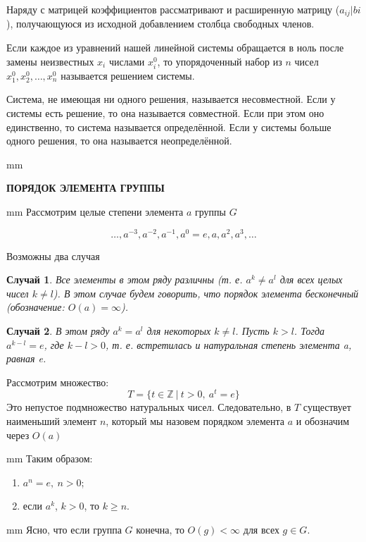 \documentclass[12pt,english,russian]{article}
\newtheorem{sluch}{Случай}
\begin{document}
	Наряду с матрицей коэффициентов рассматривают и
	расширенную матрицу
	($a_{ij}|bi$), получающуюся из исходной добавлением столбца свободных членов.

	Если каждое из уравнений нашей линейной системы обращается в ноль после замены неизвестных 
	$x_i$ числами
	$x_i^0$, то упорядоченный набор из $n$ чисел
	$x_1^0, x_2^0, \dots , x_n^0$ называется решением
	системы. 

	Система, не имеющая ни одного решения, называется
	несовместной. Если у системы есть решение, то она называется
	совместной. Если при этом оно единственно, то система называется
	определённой. Если у системы больше одного решения, то она называется
	неопределённой.
	
	 mm
	\begin{center}
		{\large {\bf ПОРЯДОК ЭЛЕМЕНТА ГРУППЫ}}
	\end{center}
	
	 mm
	Рассмотрим целые степени элемента $a$ группы $G$
	
	$$\dots ,a^{-3},a^{-2},a^{-1},a^0 = e,a,a^2,a^3,\dots$$
	
	Возможны два случая
	\begin{sluch}
		Все элементы в этом ряду различны (т. е. $a^k \ne a^l$ для 
		всех целых чисел $k\ne l$). В этом случае будем говорить, 
		что порядок элемента бесконечный (обозначение: $O(a) = \infty$).
	\end{sluch}

	\begin{sluch}
		В этом ряду $a^k = a^l$ для некоторых $k \ne l$. Пусть $k > l$. 
		Тогда $a^{k-l}=e$, где $k-l > 0$, т. е. встретилась и натуральная 
		степень элемента a, равная e. 
	\end{sluch}
	Рассмотрим множество:
	\begin{equation}
		T = \{t \in \mathbb{Z} \ | \ t>0, \ a^t = e\}
	\end{equation}
	Это непустое подмножество натуральных чисел. Следовательно, в
	$T$ существует наименьший элемент $n$, который мы назовем порядком элемента $a$
	и обозначим через $O(a)$
	
	 mm
	Таким образом:
	\begin{enumerate}
		\item $a^n=e, \ n>0$;
		\item если $a^k$, $k>0$, то $k\geqslant n$.
	\end{enumerate}
	
	 mm
	Ясно, что если группа $G$ конечна, то $O(g) < \infty$ для 
	всех $g\in G$.
	
\end{document}

